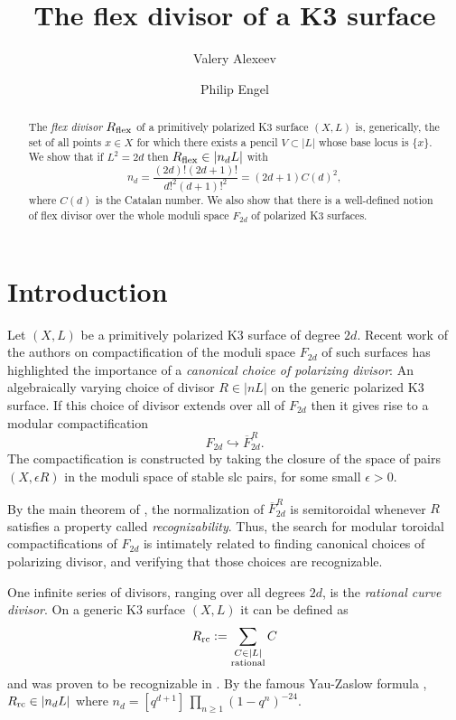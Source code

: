 \documentclass{amsart}
\title{The flex divisor of a K3 surface}
\author{Valery Alexeev}
\author{Philip Engel}
\theoremstyle{definition}
\begin{document}
\begin{abstract}
The {\it flex divisor} $R_{\rm flex}$ of a primitively polarized K3 surface $(X,L)$ 
is, generically, the set of all points $x\in X$ for which there exists
a pencil $V\subset |L|$ whose base locus is $\{x\}$. We show
that if $L^2=2d$ then $R_{\rm flex}\in |n_dL|$ with
$$n_d= \frac{(2d)!(2d+1)!}{d!^2(d+1)!^2} =(2d+1)C(d)^2,$$
where $C(d)$ is the Catalan number.
We also show that there is a well-defined notion of flex divisor over
the whole moduli space $F_{2d}$ of polarized K3 surfaces.
\end{abstract}
\maketitle

\section{Introduction}

Let $(X,L)$ be a primitively polarized K3 surface of degree $2d$. Recent work of the authors
on compactification of the moduli space $F_{2d}$ of such
surfaces
has highlighted the importance of a
{\it canonical choice of polarizing divisor}: An algebraically varying
choice of divisor $R\in |nL|$ on the generic polarized K3 surface.
If this choice of divisor extends over all of $F_{2d}$ then it gives rise to
a modular compactification $$F_{2d}\hookrightarrow \overline{F}_{2d}^R.$$ The compactification
is constructed by taking the closure of the space of pairs $(X,\epsilon R)$ in the moduli space
of stable slc pairs, for some small $\epsilon>0$.

By the main theorem of \cite{alexeev2021compact}, the normalization of 
$\overline{F}_{2d}^R$ is semitoroidal whenever $R$ satisfies a property
called {\it recognizability}. Thus, the search for modular toroidal compactifications
of $F_{2d}$ is intimately related to finding canonical choices
of polarizing divisor, and verifying that those choices
are recognizable.

One infinite series of divisors, ranging over all degrees $2d$, is the {\it rational curve divisor}.
On a generic K3 surface $(X,L)$ it can be defined as
$$R_{\rm rc}:=\sum_{\substack{C\in |L| \\ \textrm{rational}}}C$$
and was proven to be recognizable in \cite{alexeev2021compact}.
By the famous Yau-Zaslow formula \cite{yau1996bps, beauville1999counting},
$R_{\rm rc}\in |n_dL|$ where $n_d = [q^{d+1}]\,\prod_{n\geq 1} (1-q^n)^{-24}$.
\end{document}
